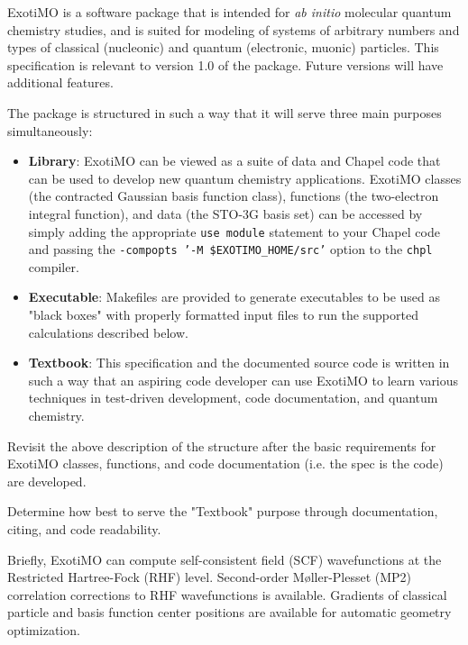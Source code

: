 \label{Scope}

ExotiMO is a software package that is intended for \textit{ab initio} molecular quantum chemistry
studies, and is suited for modeling of systems of arbitrary numbers and types of 
classical (\eg nucleonic) and quantum (\eg electronic, muonic) particles. 
This specification is relevant to version 1.0 of the package. Future versions
will have additional features.

The package is structured in such a way that it will serve three main purposes simultaneously:
\begin{itemize}
\item \textbf{Library}: ExotiMO can be viewed as a suite of data and Chapel code that can be used to 
develop new quantum chemistry applications. ExotiMO classes (\eg the contracted Gaussian basis function class), 
functions (\eg the two-electron integral function), and data (\eg the STO-3G basis set) can be accessed 
by simply adding the appropriate \lstinline{use module} statement to your Chapel code and passing the
{\footnotesize\texttt{-compopts '-M \$EXOTIMO\_HOME/src'}} option to the 
\lstinline{chpl} compiler.
\item \textbf{Executable}: Makefiles are provided to generate executables to be used as "black boxes" with
properly formatted input files to run the supported calculations described below.
\item \textbf{Textbook}: This specification and the documented source code is written in such a way that an 
aspiring code developer can use ExotiMO to learn various techniques in test-driven development, code
documentation, and quantum chemistry.
\end{itemize}

\begin{TODO}
Revisit the above description of the structure after the basic requirements for ExotiMO classes, 
functions, and code documentation (i.e. the spec is the code) are developed.
\end{TODO}

\begin{TODO}
Determine how best to serve the "Textbook" purpose through documentation, citing, and code readability.
\end{TODO}

Briefly, ExotiMO can compute self-consistent field (SCF) wavefunctions at the Restricted Hartree-Fock (RHF)
level. Second-order M\o ller-Plesset (MP2) correlation corrections to RHF wavefunctions is available. 
Gradients of classical particle and basis function center positions are available for automatic geometry optimization.  


